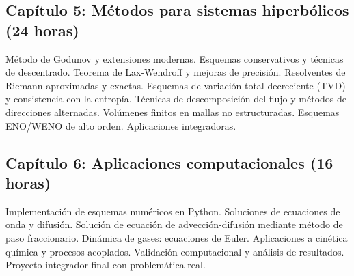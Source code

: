 \subsection*{Capítulo 5: Métodos para sistemas hiperbólicos (24 horas)}

Método de Godunov y extensiones modernas.
Esquemas conservativos y técnicas de descentrado.
Teorema de Lax-Wendroff y mejoras de precisión.
Resolventes de Riemann aproximadas y exactas.
Esquemas de variación total decreciente (TVD) y consistencia con la
entropía.
Técnicas de descomposición del flujo y métodos de direcciones
alternadas.
Volúmenes finitos en mallas no estructuradas.
Esquemas ENO/WENO de alto orden.
Aplicaciones integradoras.

\subsection*{Capítulo 6: Aplicaciones computacionales (16 horas)}

Implementación de esquemas numéricos en Python.
Soluciones de ecuaciones de onda y difusión.
Solución de ecuación de advección-difusión mediante método de paso
fraccionario.
Dinámica de gases: ecuaciones de Euler.
Aplicaciones a cinética química y procesos acoplados.
Validación computacional y análisis de resultados.
Proyecto integrador final con problemática real.

